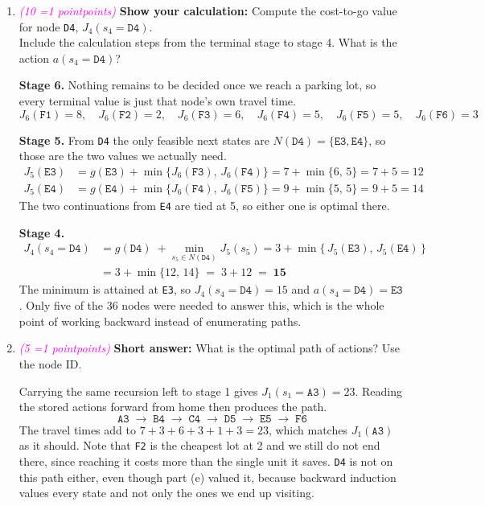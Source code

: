 \documentclass[11pt, letter, answers]{exam}
\newcommand{\grade}[1]{
    \small\textcolor{magenta}{\emph{(#1 \ifnum#1=1 point\else points\fi)}}%
    \normalsize
}
\newcommand{\saq}{\textbf{Short answer: }}
\newcommand{\sCal}{\textbf{Show your calculation: }}
\begin{document}
\begin{enumerate}[label=(\alph*)]
\item \grade{10} \sCal Compute the cost-to-go value for node \texttt{D4}, $J_4(s_4=\texttt{D4})$. 
\\Include the calculation steps from the terminal stage to stage 4.
What is the action $a(s_4=\texttt{D4})$?
\begin{answerBox}[height=6in]
\textbf{Stage 6.} Nothing remains to be decided once we reach a parking lot, so every terminal value is just that node's own travel time.
\[ J_6(\texttt{F1})=8,\quad J_6(\texttt{F2})=2,\quad J_6(\texttt{F3})=6,\quad J_6(\texttt{F4})=5,\quad J_6(\texttt{F5})=5,\quad J_6(\texttt{F6})=3 \]

\textbf{Stage 5.} From \texttt{D4} the only feasible next states are $N(\texttt{D4})=\{\texttt{E3},\texttt{E4}\}$, so those are the two values we actually need.
\begin{align*}
J_5(\texttt{E3}) &= g(\texttt{E3}) + \min\{J_6(\texttt{F3}),\, J_6(\texttt{F4})\} = 7 + \min\{6,\,5\} = 7 + 5 = 12 \\
J_5(\texttt{E4}) &= g(\texttt{E4}) + \min\{J_6(\texttt{F4}),\, J_6(\texttt{F5})\} = 9 + \min\{5,\,5\} = 9 + 5 = 14
\end{align*}
The two continuations from \texttt{E4} are tied at 5, so either one is optimal there.

\textbf{Stage 4.}
\begin{align*}
J_4(s_4=\texttt{D4}) &= g(\texttt{D4}) \;+ \min_{s_5 \in N(\texttt{D4})} J_5(s_5)
= 3 + \min\{\, J_5(\texttt{E3}),\, J_5(\texttt{E4}) \,\} \\
&= 3 + \min\{12,\, 14\} \;=\; 3 + 12 \;=\; \mathbf{15}
\end{align*}
The minimum is attained at \texttt{E3}, so $J_4(s_4=\texttt{D4}) = 15$ and $a(s_4=\texttt{D4}) = \texttt{E3}$. Only five of the 36 nodes were needed to answer this, which is the whole point of working backward instead of enumerating paths.
\end{answerBox}


\item \grade{5} \saq What is the optimal path of actions? Use the node ID.
\begin{answerBox}[height=2in]
Carrying the same recursion left to stage 1 gives $J_1(s_1=\texttt{A3}) = 23$. Reading the stored actions forward from home then produces the path.
\[ \texttt{A3} \;\rightarrow\; \texttt{B4} \;\rightarrow\; \texttt{C4} \;\rightarrow\; \texttt{D5} \;\rightarrow\; \texttt{E5} \;\rightarrow\; \texttt{F6} \]
The travel times add to $7+3+6+3+1+3 = 23$, which matches $J_1(\texttt{A3})$ as it should. Note that \texttt{F2} is the cheapest lot at 2 and we still do not end there, since reaching it costs more than the single unit it saves. \texttt{D4} is not on this path either, even though part (e) valued it, because backward induction values every state and not only the ones we end up visiting.
\end{answerBox}

\end{enumerate}
\end{document}
